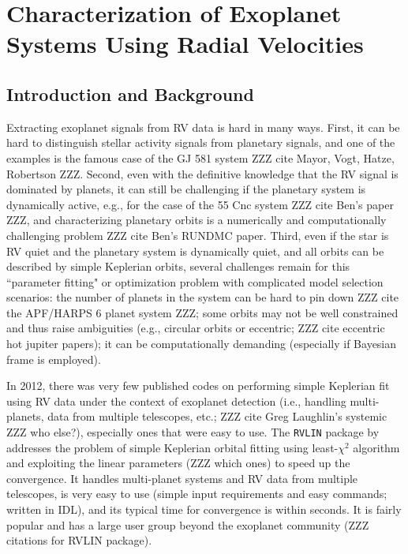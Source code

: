 \chapter{Characterization of Exoplanet Systems Using Radial
  Velocities}


\section{Introduction and Background}

Extracting exoplanet signals from RV data is hard in many ways. First,
it can be hard to distinguish stellar activity signals from planetary
signals, and one of the examples is the famous case of the GJ 581
system ZZZ cite Mayor, Vogt, Hatze, Robertson ZZZ. Second, even with
the definitive knowledge that the RV signal is dominated by planets,
it can still be challenging if the planetary system is dynamically
active, e.g., for the case of the 55 Cnc system ZZZ cite Ben's paper
ZZZ, and characterizing planetary orbits is a numerically and
computationally challenging problem ZZZ cite Ben's RUNDMC
paper. Third, even if the star is RV quiet and the planetary system is
dynamically quiet, and all orbits can be described by simple Keplerian
orbits, several challenges remain for this ``parameter fitting" or
optimization problem with complicated model selection scenarios: the
number of planets in the system can be hard to pin down ZZZ cite the
APF/HARPS 6 planet system ZZZ; some orbits may not be well constrained
and thus raise ambiguities (e.g., circular orbits or eccentric; ZZZ
cite eccentric hot jupiter papers); it can be computationally
demanding (especially if Bayesian frame is employed).

In 2012, there was very few published codes on performing simple
Keplerian fit using RV data under the context of exoplanet detection
(i.e., handling multi-planets, data from multiple telescopes, etc.;
ZZZ cite Greg Laughlin's systemic ZZZ who else?), especially ones that
were easy to use. The {\tt RVLIN} package by \cite{rvlin} addresses
the problem of simple Keplerian orbital fitting using least-$\chi^2$
algorithm and exploiting the linear parameters (ZZZ which ones) to
speed up the convergence. It handles multi-planet systems and RV data
from multiple telescopes, is very easy to use (simple input
requirements and easy commands; written in IDL), and its typical time
for convergence is within seconds. It is fairly popular and has a
large user group beyond the exoplanet community (ZZZ citations for
RVLIN package).

